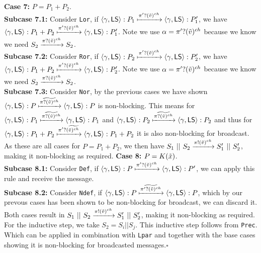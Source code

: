 \textbf{Case 7: } $P=P_1+P_2 $. \\
\indent \textbf{Subcase 7.1: } Consider \texttt{Lor}, if $\langle \gamma , \mathsf{LS} \rangle : P_1 \xmapsto[]{\pi ' ? (\Tilde{v})^{ch}}\langle \gamma , \mathsf{LS} \rangle : P_1'$, we have $\langle \gamma , \mathsf{LS} \rangle : P_1+P_2 \xmapsto[]{\pi ' ? (\Tilde{v})^{ch}}\langle \gamma , \mathsf{LS} \rangle : P_1'$. Note we use $\alpha = \pi ' ? (\Tilde{v})^{ch}$ because we know we need $S_2 \xrightarrow[]{\pi ?(\Tilde{v})^{ch}}S_2$.\\
\indent \textbf{Subcase 7.2: } Consider \texttt{Ror}, if $\langle \gamma , \mathsf{LS} \rangle : P_2 \xmapsto[]{\pi ' ? (\Tilde{v})^{ch}}\langle \gamma , \mathsf{LS} \rangle : P_2'$, we have $\langle \gamma , \mathsf{LS} \rangle : P_1+P_2 \xmapsto[]{\pi ' ? (\Tilde{v})^{ch}}\langle \gamma , \mathsf{LS} \rangle : P_2'$. Note we use $\alpha = \pi ' ? (\Tilde{v})^{ch}$ because we know we need $S_2 \xrightarrow[]{\pi ?(\Tilde{v})^{ch}}S_2$.\\
\indent \textbf{Subcase 7.3: } Consider \texttt{Nor}, by the previous cases we have shown $\langle \gamma, \mathsf{LS}\rangle : P \xmapsto[]{\widetilde{\pi ?(\Tilde{v})^{ch}}}\langle \gamma, \mathsf{LS}\rangle : P$ is non-blocking. This means for $\langle \gamma, \mathsf{LS}\rangle : P_1 \xmapsto[]{\widetilde{\pi ?(\Tilde{v})^{ch}}}\langle \gamma, \mathsf{LS}\rangle : P_1$ and $\langle \gamma, \mathsf{LS}\rangle : P_2 \xmapsto[]{\widetilde{\pi ?(\Tilde{v})^{ch}}}\langle \gamma, \mathsf{LS}\rangle : P_2$ and thus for \\
\indent $\langle \gamma , \mathsf{LS} \rangle : P_1+P_2 \xmapsto[]{\pi ' ? (\widetilde{\Tilde{v})^{ch}}}\langle \gamma , \mathsf{LS} \rangle : P_1+P_2$ it is also non-blocking for broadcast.\\
As these are all cases for $P=P_1+P_2$, we then have $S_1\ ||\ S_2 \xrightarrow[]{\pi !(\Tilde{v})^{ch}}S_1'\ ||\ S_2'$, making it non-blocking as required.
\textbf{Case 8: } $P=K(\Tilde{x}) $.\\ 
\indent \textbf{Subcase 8.1: } Consider \texttt{Def}, if $\langle \gamma , \mathsf{LS} \rangle : P \xmapsto[]{\pi ' ? (\Tilde{v})^{ch}}\langle \gamma , \mathsf{LS} \rangle : P'$, we can apply this rule and receive the message.\\
\indent \textbf{Subcase 8.2: } Consider \texttt{Ndef}, if $\langle \gamma , \mathsf{LS} \rangle : P \xmapsto[]{\widetilde{\pi ' ? (\Tilde{v})^{ch}}}\langle \gamma , \mathsf{LS} \rangle : P$, which by our prevous cases has been shown to be non-blocking for broadcast, we can discard it.\\
Both cases result in $S_1\ ||\ S_2 \xrightarrow[]{\pi !(\Tilde{v})^{ch}}S_1'\ ||\ S_2'$, making it non-blocking as required.
\\
For the inductive step, we take $S_2=S_i || S_j $. This inductive step follows from \texttt{Prec}. Which can be applied in combination with \texttt{Lpar} and together with the base cases showing it is non-blocking for broadcasted messages.$\square$\\
